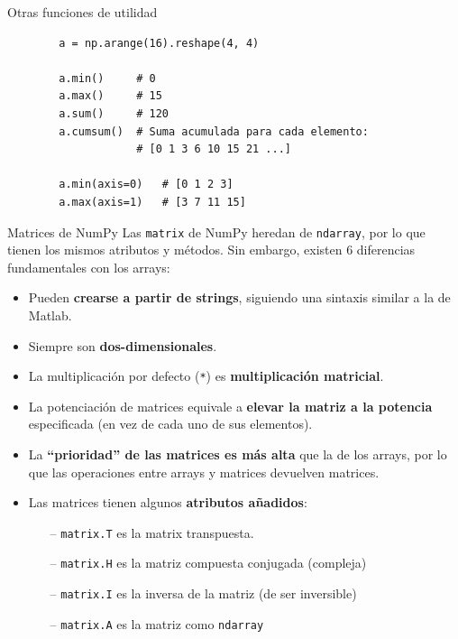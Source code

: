 \documentclass[10pt]{beamer} %
\begin{document}
\begin{frame}[fragile]{Otras funciones de utilidad}
    \begin{verbatim}
        a = np.arange(16).reshape(4, 4)
        
        a.min()     # 0
        a.max()     # 15
        a.sum()     # 120
        a.cumsum()  # Suma acumulada para cada elemento:
                    # [0 1 3 6 10 15 21 ...]
        
        a.min(axis=0)   # [0 1 2 3]
        a.max(axis=1)   # [3 7 11 15]
    \end{verbatim}
\end{frame}

\begin{frame}{Matrices de NumPy}
Las \texttt{matrix} de NumPy heredan de \texttt{ndarray}, por lo que tienen los mismos atributos y métodos. Sin embargo, existen 6 diferencias fundamentales con los arrays:
    \begin{itemize}
        \item Pueden \textbf{crearse a partir de strings}, siguiendo una sintaxis similar a la de Matlab.
        \item Siempre son \textbf{dos-dimensionales}.
        \item La multiplicación por defecto (\texttt{*}) es \textbf{multiplicación matricial}.
        \item La potenciación de matrices equivale a \textbf{elevar la matriz a la potencia} especificada (en vez de cada uno de sus elementos).
        \item La \textbf{``prioridad'' de las matrices es más alta} que la de los arrays, por lo que las operaciones entre arrays y matrices devuelven matrices.
        \item Las matrices tienen algunos \textbf{atributos añadidos}:
        \begin{itemize}
            \item[--] \texttt{matrix.T} es la matrix transpuesta.
            \item[--] \texttt{matrix.H} es la matriz compuesta conjugada (compleja)
            \item[--] \texttt{matrix.I} es la inversa de la matriz (de ser inversible)
            \item[--] \texttt{matrix.A} es la matriz como \texttt{ndarray}
        \end{itemize}
    \end{itemize}
\end{frame}
\end{document}
